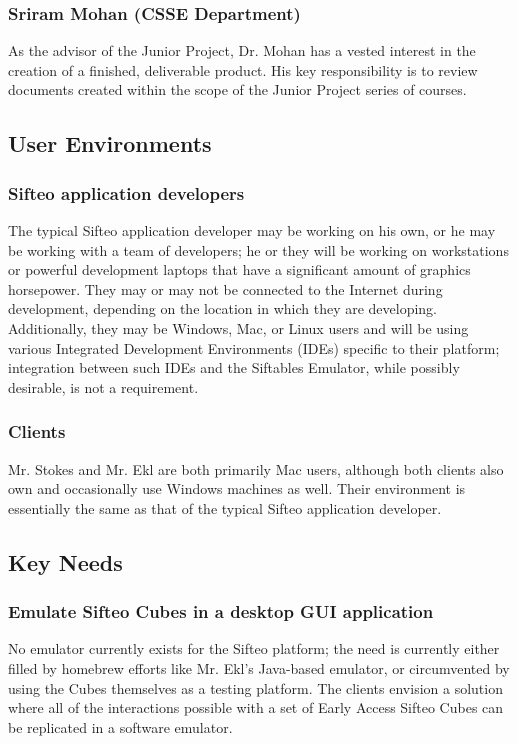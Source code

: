 \documentclass[12pt]{article}
\begin{document}
                          \subsubsection{Sriram Mohan (CSSE Department)}
                          As the advisor of the Junior Project, Dr. Mohan has a vested interest in the creation of a finished, deliverable product. His key responsibility is to review documents created within the scope of the Junior Project series of courses.

               \subsection{User Environments}

                          \subsubsection{Sifteo application developers}
                          The typical Sifteo application developer may be working on his own, or he may be working with a team of developers; he or they will be working on workstations or powerful development laptops that have a significant amount of graphics horsepower. They may or may not be connected to the Internet during development, depending on the location in which they are developing. Additionally, they may be Windows, Mac, or Linux users and will be using various Integrated Development Environments (IDEs) specific to their platform; integration between such IDEs and the Siftables Emulator, while possibly desirable, is not a requirement.

                          \subsubsection{Clients}
			  Mr. Stokes and Mr. Ekl are both primarily Mac users, although both clients also own and occasionally use Windows machines as well. Their environment is essentially the same as that of the typical Sifteo application developer.

               \subsection{Key Needs}

                          \subsubsection{Emulate Sifteo Cubes in a desktop GUI application}
                          No emulator currently exists for the Sifteo platform; the need is currently either filled by homebrew efforts like Mr. Ekl's Java-based emulator, or circumvented by using the Cubes themselves as a testing platform. The clients envision a solution where all of the interactions possible with a set of Early Access Sifteo Cubes can be replicated in a software emulator.
\end{document}
